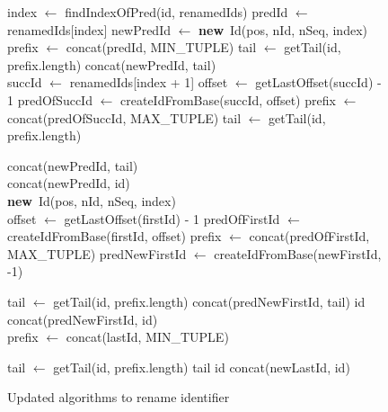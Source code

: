 \documentclass[10pt,journal,compsoc]{IEEEtran}
\let\MYoriglatexcaption\caption
\renewcommand{\caption}[2][\relax]{\MYoriglatexcaption[#2]{#2}}
\newcommand{\new}{\textbf{new}}
\begin{document}
\begin{figure}
    \begin{algorithmic}
            \State index $\gets$ findIndexOfPred(id, renamedIds)
            \State predId $\gets$ renamedIds[index]
            \State newPredId $\gets$ \new~Id(pos, nId, nSeq, index)
            \\
                \State prefix $\gets$ concat(predId, MIN\_TUPLE)
                \State tail $\gets$ getTail(id, prefix.length)
                    \State \Return concat(newPredId, tail)
                \EndIf
            \EndIf
            \\
            \State succId $\gets$ renamedIds[index + 1]
                \State offset $\gets$ getLastOffset(succId) - 1
                \State predOfSuccId $\gets$ createIdFromBase(succId, offset)
                \State prefix $\gets$ concat(predOfSuccId, MAX\_TUPLE)
                \State tail $\gets$ getTail(id, prefix.length)

                    \State \Return concat(newPredId, tail)
                \EndIf
            \EndIf
            \\
            \State \Return concat(newPredId, id)
        \EndFunction
        \\
            \State \Return \new~Id(pos, nId, nSeq, index)
        \EndFunction
        \\
            \State offset $\gets$ getLastOffset(firstId) - 1
            \State predOfFirstId $\gets$ createIdFromBase(firstId, offset)
            \State prefix $\gets$ concat(predOfFirstId, MAX\_TUPLE)
            \State predNewFirstId $\gets$ createIdFromBase(newFirstId, -1)

                \State tail $\gets$ getTail(id, prefix.length)
                \State \Return concat(predNewFirstId, tail)
                \State \Return id
            \Else
                \State \Return concat(predNewFirstId, id)
            \EndIf
        \EndFunction
        \\
            \State prefix $\gets$ concat(lastId, MIN\_TUPLE)

                \State tail $\gets$ getTail(id, prefix.length)
                \State \Return tail
                \State \Return id
            \Else
                \State \Return concat(newLastId, id)
            \EndIf
        \EndFunction
    \end{algorithmic}
    \caption{Updated algorithms to rename identifier}
    \label{alg:updated-rename-id}
\end{figure}
\end{document}
